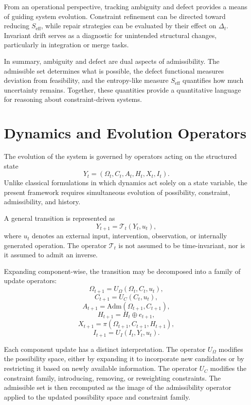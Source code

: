 \documentclass[11pt,oneside]{article}
\begin{document}
From an operational perspective, tracking ambiguity and defect provides a means of guiding system evolution. Constraint refinement can be directed toward reducing \( S_{\mathrm{eff}} \), while repair strategies can be evaluated by their effect on \( \Delta_t \). Invariant drift serves as a diagnostic for unintended structural changes, particularly in integration or merge tasks.

In summary, ambiguity and defect are dual aspects of admissibility. The admissible set determines what is possible, the defect functional measures deviation from feasibility, and the entropy-like measure \( S_{\mathrm{eff}} \) quantifies how much uncertainty remains. Together, these quantities provide a quantitative language for reasoning about constraint-driven systems.

\section{Dynamics and Evolution Operators}

The evolution of the system is governed by operators acting on the structured state
\[
Y_t = (\Omega_t, C_t, A_t, H_t, X_t, I_t).
\]
Unlike classical formulations in which dynamics act solely on a state variable, the present framework requires simultaneous evolution of possibility, constraint, admissibility, and history.

A general transition is represented as
\[
Y_{t+1} = \mathcal{T}_t(Y_t, u_t),
\]
where \( u_t \) denotes an external input, intervention, observation, or internally generated operation. The operator \( \mathcal{T}_t \) is not assumed to be time-invariant, nor is it assumed to admit an inverse.

Expanding component-wise, the transition may be decomposed into a family of update operators:
\[
\Omega_{t+1} = U_{\Omega}(\Omega_t, C_t, u_t),
\]
\[
C_{t+1} = U_C(C_t, u_t),
\]
\[
A_{t+1} = \mathrm{Adm}(\Omega_{t+1}, C_{t+1}),
\]
\[
H_{t+1} = H_t \oplus e_{t+1},
\]
\[
X_{t+1} = \pi(\Omega_{t+1}, C_{t+1}, H_{t+1}),
\]
\[
I_{t+1} = U_I(I_t, Y_t, u_t).
\]

Each component update has a distinct interpretation. The operator \( U_{\Omega} \) modifies the possibility space, either by expanding it to incorporate new candidates or by restricting it based on newly available information. The operator \( U_C \) modifies the constraint family, introducing, removing, or reweighting constraints. The admissible set is then recomputed as the image of the admissibility operator applied to the updated possibility space and constraint family.
\end{document}

